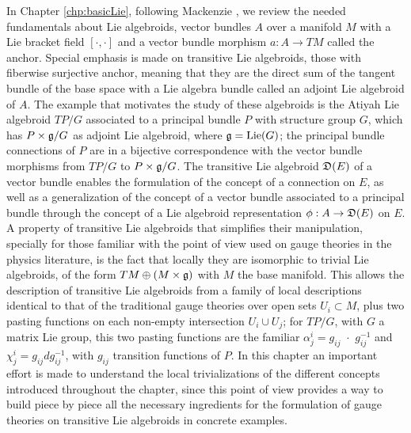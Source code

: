 In Chapter \ref{chp:basicLie}, following Mackenzie \cite{Mackenzie2005}, we review the needed fundamentals about Lie algebroids, vector bundles $A$ over a manifold $M$ with a Lie bracket field $[\cdot, \cdot ]$ and a vector bundle morphism $a:A \to TM$ called the anchor. Special emphasis is made on transitive Lie algebroids, those with fiberwise surjective anchor, meaning that they are the direct sum of the tangent bundle of the base space with a Lie algebra bundle called an adjoint Lie algebroid of $A$. The example that motivates the study of these algebroids is the Atiyah Lie algebroid $TP/G$ associated to a principal bundle $P$ with structure group $G$, which has $P \times \mathfrak{g}/G$ as adjoint Lie algebroid, where $\mathfrak{g} = \text{Lie}(G)$; the principal bundle connections of $P$ are in a bijective correspondence with the vector bundle morphisms from $TP/G$ to $P \times \mathfrak{g}/G$. The transitive Lie algebroid $\mathfrak{D}(E)$ of a vector bundle enables the formulation of the concept of a connection on $E$, as well as a generalization of the concept of a vector bundle associated to a principal bundle through the concept of a Lie algebroid representation $\phi: A \to \alg D(E)$ on $E$. A property of transitive Lie algebroids that simplifies their manipulation, specially for those familiar with the point of view used on gauge theories in the physics literature, is the fact that locally they are isomorphic to trivial Lie algebroids, of the form $TM \oplus (M \times \mathfrak{g})$ with $M$ the base manifold. This allows the description of transitive Lie algebroids from a family of local descriptions identical to that of the traditional gauge theories over open sets $U_i \subset M$, plus two pasting functions on each non-empty intersection $U_i \cup U_j$; for $TP/G$, with $G$ a matrix Lie group, this two pasting functions are the familiar $\alpha^i_j = g_{ij} \,\,\cdot \,\, g_{ij}^{-1}$ and $\chi^i_j = g_{ij} dg_{ij}^{-1}$, with $g_{ij}$ transition functions of $P$. In this chapter an important effort is made to understand the local trivializations of the different concepts introduced throughout the chapter, since this point of view provides a way to build piece by piece all the necessary ingredients for the formulation of gauge theories on transitive Lie algebroids in concrete examples.

